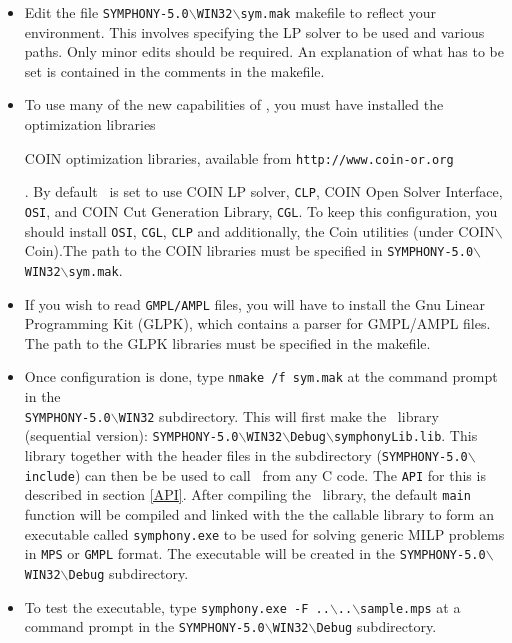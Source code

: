 \begin{itemize}

\item Edit the file
\texttt{SYMPHONY-5.0$\backslash$WIN32$\backslash$sym.mak} makefile to
reflect your environment. This involves specifying the LP solver to be used
and various paths. Only minor edits should be required. An explanation of what
has to be set is contained in the comments in the makefile.

\item To use many of the new capabilities of \BB, you must have installed
the \emph{} optimization
libraries 
\begin{latexonly} 
COIN optimization libraries, available from
\texttt{http://www.coin-or.org} 
\end{latexonly}. By default \BB\ is 
set to use COIN LP solver, \texttt{CLP}, COIN Open Solver Interface, 
\texttt{OSI}, and COIN Cut Generation Library, \texttt{CGL}. To keep this 
configuration, you should install \texttt{OSI}, \texttt{CGL}, \texttt{CLP} 
and additionally, the Coin utilities (under COIN$\backslash$Coin).The path to 
the COIN libraries must be specified in 
\texttt{SYMPHONY-5.0$\backslash$WIN32$\backslash$sym.mak}.

\item If you wish to read \texttt{GMPL/AMPL} files, you will have to install the 
Gnu Linear Programming Kit (GLPK), which contains a parser for GMPL/AMPL
files. The path to the GLPK libraries must be specified in
the makefile.

\item Once configuration is done, type \texttt{nmake /f sym.mak} at the
command prompt in the \\
\texttt{SYMPHONY-5.0$\backslash$WIN32} subdirectory. 
This will first make the \BB\ library (sequential version): 
\texttt{SYMPHONY-5.0$\backslash$WIN32$\backslash$Debug$\backslash$symphonyLib.lib}. This library together with the header files in the subdirectory
(\texttt{SYMPHONY-5.0$\backslash$include}) can then be
be used to call \BB\ from any C code. The \texttt{API} for this is 
described in section \ref{API}.
After compiling the \BB\ library, the default \texttt{main} function will 
be compiled and linked with the the callable library to form an executable
called \texttt{symphony.exe} to be used for solving generic MILP problems 
in \texttt{MPS} or \texttt{GMPL} format. The executable will be created in the
\texttt{SYMPHONY-5.0$\backslash$WIN32$\backslash$Debug} subdirectory.

\item To test the executable, type \texttt{symphony.exe -F 
..$\backslash$..$\backslash$sample.mps} at a command prompt in the
\texttt{SYMPHONY-5.0$\backslash$WIN32$\backslash$Debug} subdirectory.

\end{itemize}

